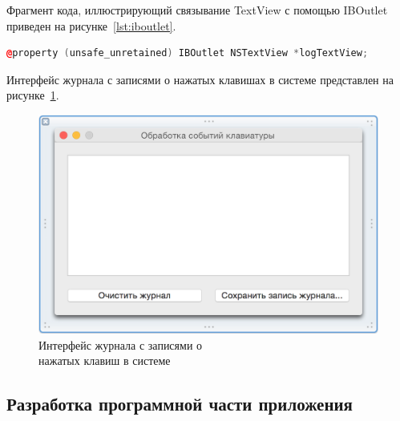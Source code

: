 Фрагмент кода, иллюстрирующий связывание TextView с помощью IBOutlet приведен
на рисунке~\ref{lst:iboutlet}.
\begin{lstlisting}[basicstyle=\scriptsize\ttfamily,
                   numberstyle=\scriptsize\ttfamily,
                   xleftmargin=7mm,
                   language=C++,caption=Связывание TextView с помощью IBOutlet,
                   label=lst:iboutlet]
@property (unsafe_unretained) IBOutlet NSTextView *logTextView;
\end{lstlisting}

Интерфейс журнала с записями о нажатых клавишах в системе представлен
на рисунке~\ref{pic:log_window}.
\begin{figure}[h!]
  \centering
  \includegraphics[width=150mm]{pic/log_window.png}
  \caption{Интерфейс журнала с записями о \\ нажатых клавиш в системе}
  \label{pic:log_window}
\end{figure}

\subsection{Разработка программной части приложения}

